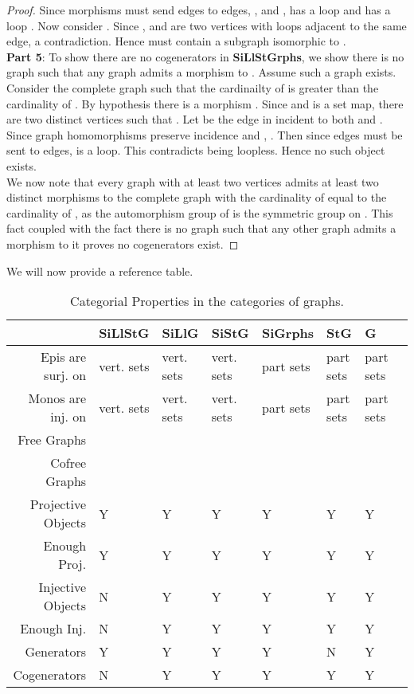 \documentclass[11pt]{article}
\begin{document}
\begin{proof}
\indent Since morphisms must send edges to edges, \textunderscore, and \textunderscore,  has a loop  and  has a loop . Now consider . Since \textunderscore\textunderscore,  and  are two vertices with loops adjacent to the same edge, a contradiction. Hence  must contain a subgraph isomorphic to .\\
\indent \textbf{Part 5}:
To show there are no cogenerators in \textbf{SiLlStGrphs}, we show there is no graph  such that any graph  admits a morphism to . Assume such a graph  exists. Consider the complete graph  such that the cardinailty of  is greater than the cardinality of . By hypothesis there is a morphism . Since  and  is a set map, there are two distinct vertices  such that . Let  be the edge in  incident to both  and . Since graph homomorphisms preserve incidence and , \textunderscore. Then since edges must be sent to edges,  is a loop. This contradicts  being loopless. Hence no such object exists.\\
\indent We now note that every graph  with at least two vertices admits at least two distinct morphisms to the complete graph  with the cardinality of  equal to the cardinality of , as the automorphism group of  is the symmetric group on . This fact coupled with the fact there is no graph such that any other graph admits a morphism to it proves no cogenerators exist.
\end{proof}
\indent We will now provide a reference table.
\begin{table}[h]
\caption{Categorial Properties in the categories of graphs.}
\begin{tabular}{ r || l | l | l | l | l | l | l | }			
  \quad & \textbf{SiLlStG} & \textbf{SiLlG} & \textbf{SiStG} & \textbf{SiGrphs} & \textbf{StG} & \textbf{G} \\
\hline
  Epis are surj. on &  vert. sets & vert. sets & vert. sets & part sets & part sets & part sets \\
\hline  
  Monos are inj. on  &  vert. sets & vert. sets & vert. sets & part sets & part sets & part sets \\
\hline 
  Free Graphs &  &  &  &  &  &  \\
\hline 
  Cofree Graphs &   &  &  &  &  &  \\
\hline 
  Projective Objects & Y & Y & Y & Y & Y & Y  \\
\hline 
  Enough Proj. & Y & Y & Y & Y & Y & Y \\
\hline 
  Injective Objects  & N & Y & Y & Y & Y & Y \\
\hline 
  Enough Inj. & N & Y & Y & Y & Y & Y \\
\hline 
  Generators & Y & Y & Y & Y & N & Y\\
\hline
  Cogenerators & N & Y & Y & Y & Y & Y\\
\hline
\end{tabular}
\end{table}
\end{document}
